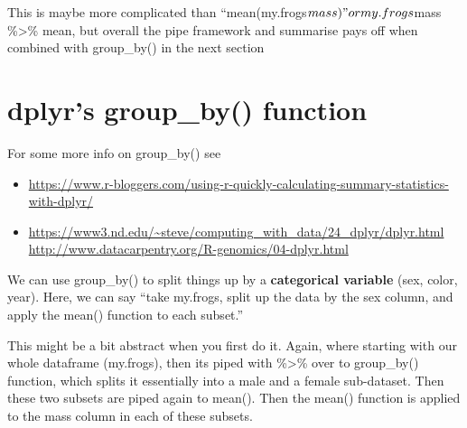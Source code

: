 \documentclass[]{book}
\newenvironment{Shaded}{\begin{snugshade}}{\end{snugshade}}
\newcommand{\KeywordTok}[1]{\textcolor[rgb]{0.13,0.29,0.53}{\textbf{#1}}}
\newcommand{\StringTok}[1]{\textcolor[rgb]{0.31,0.60,0.02}{#1}}
\newcommand{\CommentTok}[1]{\textcolor[rgb]{0.56,0.35,0.01}{\textit{#1}}}
\newcommand{\OperatorTok}[1]{\textcolor[rgb]{0.81,0.36,0.00}{\textbf{#1}}}
\newcommand{\NormalTok}[1]{#1}
\providecommand{\tightlist}{%
  \setlength{\itemsep}{0pt}\setlength{\parskip}{0pt}}
\theoremstyle{definition}
\theoremstyle{definition}
\theoremstyle{definition}
\theoremstyle{remark}
\begin{document}
\begin{Shaded}
\end{Shaded}

This is maybe more complicated than
``mean(my.frogs\(mass)" or my.frogs\)mass \%\textgreater{}\% mean, but
overall the pipe framework and summarise pays off when combined with
group\_by() in the next section

\section{dplyr's group\_by() function}\label{dplyrs-group_by-function}

For some more info on group\_by() see

\begin{itemize}
\tightlist
\item
  \url{https://www.r-bloggers.com/using-r-quickly-calculating-summary-statistics-with-dplyr/}
\item
  \url{https://www3.nd.edu/~steve/computing_with_data/24_dplyr/dplyr.html}
  \url{http://www.datacarpentry.org/R-genomics/04-dplyr.html}
\end{itemize}

We can use group\_by() to split things up by a \textbf{categorical
variable} (sex, color, year). Here, we can say ``take my.frogs, split up
the data by the sex column, and apply the mean() function to each
subset.''

\begin{Shaded}
\end{Shaded}

This might be a bit abstract when you first do it. Again, where starting
with our whole dataframe (my.frogs), then its piped with
\%\textgreater{}\% over to group\_by() function, which splits it
essentially into a male and a female sub-dataset. Then these two subsets
are piped again to mean(). Then the mean() function is applied to the
mass column in each of these subsets.
\end{document}
